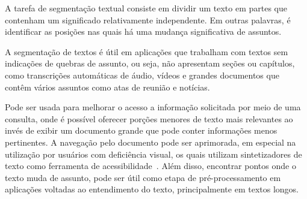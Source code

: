 A tarefa de segmentação textual consiste em dividir um texto em partes que contenham um significado relativamente independente. Em outras palavras, é identificar as posições nas quais há uma mudança significativa de assuntos. 

A segmentação de textos é útil em aplicações que trabalham com textos sem indicações de quebras de assunto, ou seja, não apresentam seções ou capítulos, como transcrições automáticas de áudio, vídeos e grandes documentos que contêm vários assuntos como atas de reunião e notícias.


Pode ser usada para melhorar o acesso a informação solicitada por meio de uma consulta, onde é possível oferecer porções menores de texto mais relevantes ao invés de exibir um documento grande que pode conter informações menos pertinentes. 
%
%
A navegação pelo documento pode ser aprimorada, em especial na utilização por usuários com deficiência visual, os quais utilizam  sintetizadores de texto como ferramenta de acessibilidade~\cite{Choi2000}. 
%
Além disso, encontrar pontos onde o texto muda de assunto, pode ser útil como etapa de pré-processamento em aplicações voltadas ao entendimento do texto, principalmente em textos longos.




